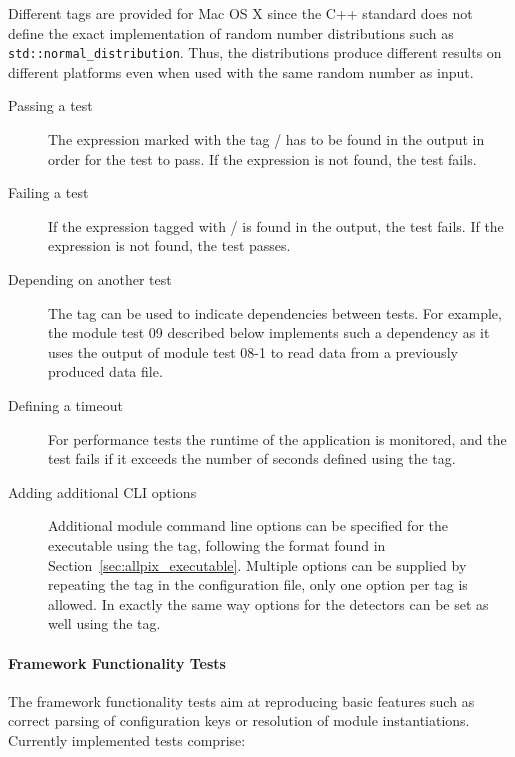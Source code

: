 Different tags are provided for Mac OS X since the C++ standard does not define the exact implementation of random number distributions such as \texttt{std::normal\_distribution}.
Thus, the distributions produce different results on different platforms even when used with the same random number as input.

\begin{description}
  \item[Passing a test] The expression marked with the tag / has to be found in the output in order for the test to pass. If the expression is not found, the test fails.
  \item[Failing a test] If the expression tagged with / is found in the output, the test fails. If the expression is not found, the test passes.
  \item[Depending on another test] The tag  can be used to indicate dependencies between tests. For example, the module test 09 described below implements such a dependency as it uses the output of module test 08-1 to read data from a previously produced \apsq data file.
  \item[Defining a timeout] For performance tests the runtime of the application is monitored, and the test fails if it exceeds the number of seconds defined using the  tag.
  \item[Adding additional CLI options] Additional module command line options can be specified for the  executable using the  tag, following the format found in Section~\ref{sec:allpix_executable}. Multiple options can be supplied by repeating the  tag in the configuration file, only one option per tag is allowed. In exactly the same way options for the detectors can be set as well using the  tag.
\end{description}

\paragraph{Framework Functionality Tests}

The framework functionality tests aim at reproducing basic features such as correct parsing of configuration keys or resolution of module instantiations.
Currently implemented tests comprise:


